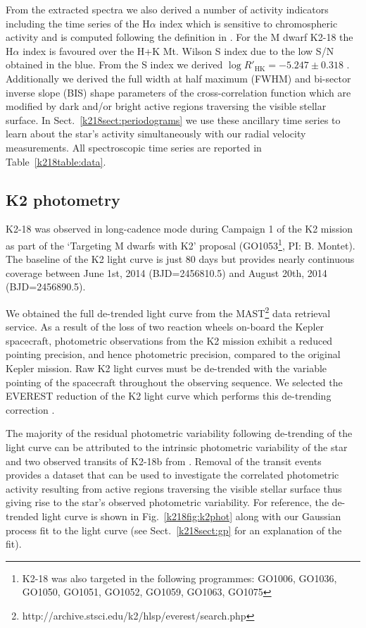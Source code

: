 From the extracted spectra we also derived a number of activity indicators including
the time series of the H$\alpha$ index which is sensitive to chromospheric activity and
is computed following the definition in \cite{bonfils07}. For the M dwarf K2-18
\citep[$V$=13.5;][]{henden14} the H$\alpha$ index is favoured over the \caii{} H+K
Mt. Wilson S index \citep{wilson68, baliunas95}
due to the low S/N obtained in the blue. From the S index we
derived $\log{R'_{\text{HK}}}=-5.247 \pm 0.318$ \citep{astudillodefru17a}. Additionally we derived
the full width at half maximum (FWHM) and bi-sector inverse slope (BIS)
shape parameters of the cross-correlation function which are modified
by dark and/or bright active regions traversing the visible stellar surface. In
Sect.~\ref{k218sect:periodograms} we use these ancillary time series to learn about
the star's activity simultaneously with our radial velocity measurements. 
All spectroscopic time series are reported in Table~\ref{k218table:data}.


\subsection{K2 photometry}
K2-18 was observed in long-cadence mode during Campaign 1 of the
K2 mission as part of the `Targeting M dwarfs with K2' proposal
(GO1053\footnote{K2-18 was also targeted in the following programmes:
  GO1006, GO1036, GO1050, GO1051, GO1052, GO1059, GO1063, GO1075}, PI: B. Montet).
The baseline of the K2 light curve is just 80 days but provides nearly continuous
coverage between June 1st, 2014 (BJD=2456810.5) and August 20th, 2014 (BJD=2456890.5). 

We obtained the full de-trended light curve from the
MAST\footnote{http://archive.stsci.edu/k2/hlsp/everest/search.php} data retrieval service. As a result
of the loss of two reaction wheels on-board the Kepler spacecraft, photometric
observations from the K2 mission exhibit a reduced pointing precision, and
hence photometric precision, compared to the original Kepler mission. Raw K2
light curves must be de-trended with the variable pointing of the
spacecraft throughout the observing sequence. We selected the EVEREST reduction of
the K2 light curve which performs this de-trending correction \citep{luger16}.

The majority of the residual photometric variability following de-trending of
the light curve can be attributed to the intrinsic photometric variability of
the star and two observed transits of K2-18b from \cite{montet15}. Removal
of the transit events provides a dataset that can be used to investigate the
correlated photometric activity resulting from active regions
traversing the visible stellar surface thus giving rise to the star's observed
photometric variability. For reference, the de-trended light curve
is shown in Fig.~\ref{k218fig:k2phot} along with our Gaussian process fit to the
light curve (see Sect.~\ref{k218sect:gp} for an explanation of the fit).

